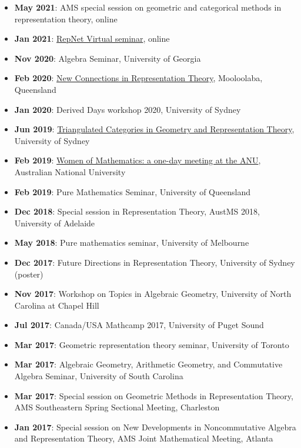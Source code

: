 \documentclass[a4paper]{moderncv}
\begin{document}
\begin{itemize}
\item \textbf{May 2021}: AMS special session on geometric and categorical methods in representation theory, online
\item \textbf{Jan 2021}: \href{https://sites.google.com/view/repnetvirtualseminar/home}{RepNet Virtual seminar}, online
\item \textbf{Nov 2020}: Algebra Seminar, University of Georgia
\item \textbf{Feb 2020}: \href{https://sites.google.com/view/mooloolaba2020/home}{New Connections in Representation Theory}, Mooloolaba, Queensland
\item \textbf{Jan 2020}: Derived Days workshop 2020, University of Sydney
\item \textbf{Jun 2019}: \href{https://sites.google.com/site/ausreptheory/workshop-2019}{Triangulated Categories in Geometry and Representation Theory}, University of Sydney
\item \textbf{Feb 2019}: \href{https://genderinstitute.anu.edu.au/women-mathematics-one-day-meeting-anu}{Women of Mathematics: a one-day meeting at the ANU}, Australian National University
\item \textbf{Feb 2019}: Pure Mathematics Seminar, University of Queensland
\item \textbf{Dec 2018}: Special session in Representation Theory, AustMS 2018, University of Adelaide
\item \textbf{May 2018}: Pure mathematics seminar, University of Melbourne
\item \textbf{Dec 2017}: Future Directions in Representation Theory, University of Sydney (poster)
\item \textbf{Nov 2017}: Workshop on Topics in Algebraic Geometry, University of North Carolina at Chapel Hill
\item \textbf{Jul 2017}: Canada/USA Mathcamp 2017, University of Puget Sound
\item \textbf{Mar 2017}: Geometric representation theory seminar, University of Toronto
\item \textbf{Mar 2017}: Algebraic Geometry, Arithmetic Geometry, and Commutative Algebra Seminar, University of South Carolina
\item \textbf{Mar 2017}: Special session on Geometric Methods in Representation Theory, AMS Southeastern Spring Sectional Meeting, Charleston
\item \textbf{Jan 2017}: Special session on New Developments in Noncommutative Algebra and Representation Theory, AMS Joint Mathematical Meeting, Atlanta

\end{itemize}
\end{document}

